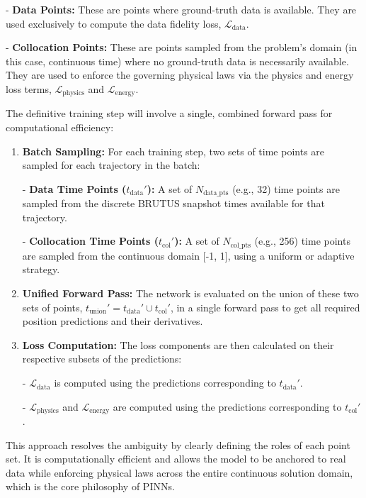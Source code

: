 \documentclass[11pt, a4paper]{article}
\begin{document}
    
- \textbf{Data Points:} These are points where ground-truth data is available. They are used exclusively to compute the data fidelity loss, $\mathcal{L}_{\text{data}}$.
    
- \textbf{Collocation Points:} These are points sampled from the problem's domain (in this case, continuous time) where no ground-truth data is necessarily available. They are used to enforce the governing physical laws via the physics and energy loss terms, $\mathcal{L}_{\text{physics}}$ and $\mathcal{L}_{\text{energy}}$.

The definitive training step will involve a single, combined forward pass for computational efficiency:
\begin{enumerate}
    \item \textbf{Batch Sampling:} For each training step, two sets of time points are sampled for each trajectory in the batch:
    
        
- \textbf{Data Time Points ($t_{\text{data}}'$):} A set of $N_{\text{data\_pts}}$ (e.g., 32) time points are sampled from the discrete BRUTUS snapshot times available for that trajectory.
        
- \textbf{Collocation Time Points ($t_{\text{col}}'$):} A set of $N_{\text{col\_pts}}$ (e.g., 256) time points are sampled from the continuous domain [-1, 1], using a uniform or adaptive strategy.
    
    \item \textbf{Unified Forward Pass:} The network is evaluated on the union of these two sets of points, $t_{\text{union}}' = t_{\text{data}}' \cup t_{\text{col}}'$, in a single forward pass to get all required position predictions and their derivatives.
    \item \textbf{Loss Computation:} The loss components are then calculated on their respective subsets of the predictions:
    
        
- $\mathcal{L}_{\text{data}}$ is computed using the predictions corresponding to $t_{\text{data}}'$.
        
- $\mathcal{L}_{\text{physics}}$ and $\mathcal{L}_{\text{energy}}$ are computed using the predictions corresponding to $t_{\text{col}}'$.
    
\end{enumerate}
This approach resolves the ambiguity by clearly defining the roles of each point set. It is computationally efficient and allows the model to be anchored to real data while enforcing physical laws across the entire continuous solution domain, which is the core philosophy of PINNs.
\end{document}
